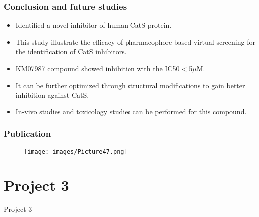 \documentclass{beamer}
\begin{document}
%

\begin{frame}
\frametitle{\textbf{Conclusion and future studies}}
\begin{itemize}
\item Identified a novel inhibitor of human CatS protein.
\item This study illustrate the efficacy of pharmacophore-based virtual screening for the identification of CatS inhibitors.
\item KM07987 compound showed inhibition with the IC50$<$5$\mu$M.
\item It can be further optimized through structural modifications to gain better inhibition against CatS.
\item In-vivo studies and toxicology studies can be performed for this compound.
\end{itemize}
\end{frame}

\begin{frame}
\frametitle{\textbf{Publication}}
\begin{figure}
\texttt{[image: images/Picture47.png]}
\end{figure}
\end{frame}


\section{Project 3}

\begin{frame}
\begin{block}
\Huge{\centerline{Project 3}}
\end{block}
\end{frame}
\end{document}
